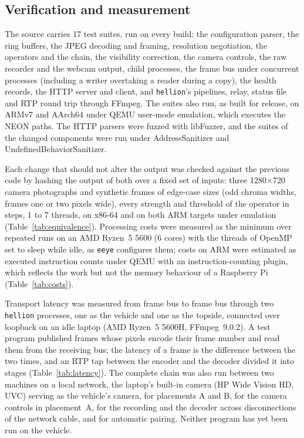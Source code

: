 \documentclass[a4paper,fleqn]{cas-sc}
\newcommand{\eeye}{\texttt{eeye}}
\newcommand{\hellion}{\texttt{hellion}}
\begin{document}
\subsection{Verification and measurement}\label{sec:verification}

The source carries 17 test suites, run on every build: the configuration parser, the
ring buffers, the JPEG decoding and framing, resolution negotiation, the operators and
the chain, the visibility correction, the camera controls, the raw recorder and the
webcam output, child processes, the frame bus under concurrent processes (including a
writer overtaking a reader during a copy), the health records, the HTTP server and
client, and \hellion{}'s pipelines, relay, status file and RTP round trip through
FFmpeg. The suites also run, as built for
release, on ARMv7 and AArch64 under QEMU user-mode emulation, which executes the NEON
paths. The HTTP parsers were fuzzed with libFuzzer, and the suites of the changed
components were run under AddressSanitizer and UndefinedBehaviorSanitizer.

Each change that should not alter the output was checked against the previous code by
hashing the output of both over a fixed set of inputs: three 1280$\times$720 camera
photographs and synthetic frames of edge-case sizes (odd chroma widths, frames one or
two pixels wide), every strength and threshold of the operator in steps, 1 to 7
threads, on x86-64 and on both ARM targets under emulation (Table~\ref{tab:equivalence}).
Processing costs were measured as the minimum over repeated runs on an AMD Ryzen~5
5600 (6 cores) with the threads of OpenMP set to sleep while idle, as \eeye{}
configures them; costs on ARM were estimated as executed instruction counts under QEMU
with an instruction-counting plugin, which reflects the work but not the memory
behaviour of a Raspberry Pi (Table~\ref{tab:costs}).

Transport latency was measured from frame bus to frame bus through two \hellion{}
processes, one as the vehicle and one as the topside, connected over loopback on an
idle laptop (AMD Ryzen~5 5600H, FFmpeg~9.0.2). A test program published frames whose
pixels encode their frame number and read them from the receiving bus; the latency of a
frame is the difference between the two times, and an RTP tap between the encoder and
the decoder divided it into stages (Table~\ref{tab:latency}). The complete chain was
also run between two machines on a local network, the laptop's built-in camera (HP
Wide Vision HD, UVC) serving as the vehicle's camera, for placements A and B, for the
camera controls in placement~A, for the recording and the decoder across disconnections
of the network cable, and for automatic pairing. Neither program has yet been run on the
vehicle.
\end{document}
